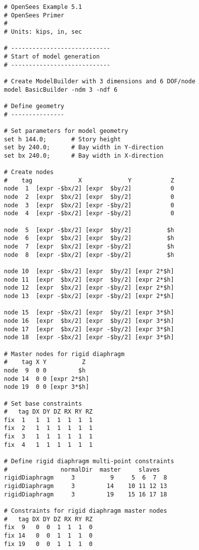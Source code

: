 \documentclass[12pt]{article}
\begin{document}
\vspace{0.2in} 
{\sf\small
\begin{verbatim}
# OpenSees Example 5.1
# OpenSees Primer
#
# Units: kips, in, sec

# ----------------------------
# Start of model generation
# ----------------------------

# Create ModelBuilder with 3 dimensions and 6 DOF/node
model BasicBuilder -ndm 3 -ndf 6

# Define geometry
# ---------------

# Set parameters for model geometry
set h 144.0;       # Story height
set by 240.0;      # Bay width in Y-direction
set bx 240.0;      # Bay width in X-direction

# Create nodes
#    tag             X             Y           Z 
node  1  [expr -$bx/2] [expr  $by/2]           0
node  2  [expr  $bx/2] [expr  $by/2]           0
node  3  [expr  $bx/2] [expr -$by/2]           0 
node  4  [expr -$bx/2] [expr -$by/2]           0 

node  5  [expr -$bx/2] [expr  $by/2]          $h 
node  6  [expr  $bx/2] [expr  $by/2]          $h 
node  7  [expr  $bx/2] [expr -$by/2]          $h 
node  8  [expr -$bx/2] [expr -$by/2]          $h 

node 10  [expr -$bx/2] [expr  $by/2] [expr 2*$h]
node 11  [expr  $bx/2] [expr  $by/2] [expr 2*$h] 
node 12  [expr  $bx/2] [expr -$by/2] [expr 2*$h] 
node 13  [expr -$bx/2] [expr -$by/2] [expr 2*$h] 

node 15  [expr -$bx/2] [expr  $by/2] [expr 3*$h] 
node 16  [expr  $bx/2] [expr  $by/2] [expr 3*$h] 
node 17  [expr  $bx/2] [expr -$by/2] [expr 3*$h] 
node 18  [expr -$bx/2] [expr -$by/2] [expr 3*$h]

# Master nodes for rigid diaphragm
#    tag X Y          Z 
node  9  0 0         $h 
node 14  0 0 [expr 2*$h]
node 19  0 0 [expr 3*$h]

# Set base constraints
#   tag DX DY DZ RX RY RZ
fix  1   1  1  1  1  1  1
fix  2   1  1  1  1  1  1
fix  3   1  1  1  1  1  1
fix  4   1  1  1  1  1  1

# Define rigid diaphragm multi-point constraints
#               normalDir  master     slaves
rigidDiaphragm     3          9     5  6  7  8
rigidDiaphragm     3         14    10 11 12 13
rigidDiaphragm     3         19    15 16 17 18

# Constraints for rigid diaphragm master nodes
#   tag DX DY DZ RX RY RZ
fix  9   0  0  1  1  1  0
fix 14   0  0  1  1  1  0
fix 19   0  0  1  1  1  0


\end{verbatim}}
\end{document}
